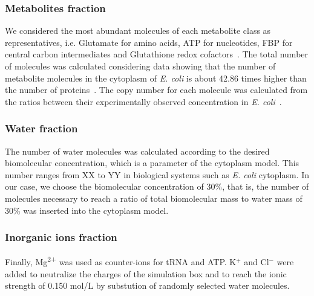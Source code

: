 \documentclass[journal=jacsat,manuscript=article]{achemso}
\begin{document}
\subsubsection{Metabolites fraction}
We considered the most abundant molecules of each metabolite class as representatives, i.e. Glutamate for amino acids, ATP for nucleotides, FBP for central carbon intermediates and Glutathione redox cofactors~\cite{Bennett2009}. The total number of molecules was calculated considering data showing that the number of metabolite molecules in the cytoplasm of \textit{E. coli} is about 42.86 times higher than the number of proteins~\cite{Bennett2009}. The copy number for each molecule was calculated from the ratios between their experimentally observed concentration in {\em E. coli}~\cite{Bennett2009}.

\subsubsection{Water fraction}
The number of water molecules was calculated according to the desired biomolecular concentration, which is a parameter of the cytoplasm model. This number ranges from \colorbox{red!50}{XX to YY} in biological systems such as \textit{E. coli} cytoplasm. In our case, we choose the biomolecular concentration of 30\%, that is, the number of molecules necessary to reach a ratio of total biomolecular mass to water mass of 30\% was inserted into the cytoplasm model.

\subsubsection{Inorganic ions fraction}
Finally, Mg\textsuperscript{2+} was used as counter-ions for tRNA and ATP. K$^{+}$ and Cl$^{-}$ were added to neutralize the charges of the simulation box and to reach the ionic strength of 0.150 mol/L by substution of randomly selected water molecules.
\end{document}
